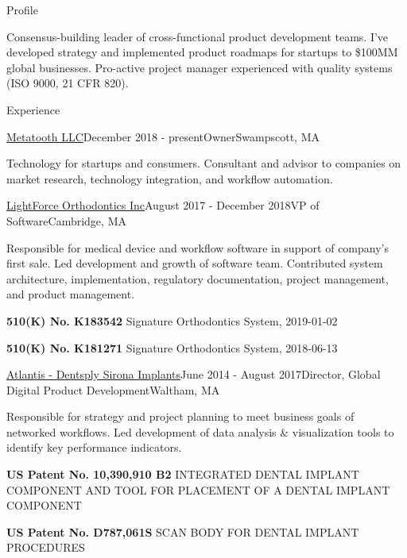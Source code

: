 \documentclass{resume}
\begin{document}
  
\begin{rSection}{Profile}
\item Consensus-building leader of cross-functional product development teams. I've developed strategy and implemented product roadmaps for startups to \$100MM global businesses. Pro-active project manager experienced with quality systems (ISO 9000, 21 CFR 820).
\end{rSection}

\begin{rSection}{Experience}

\begin{rSubsection}{\href{https://metatooth.com}{Metatooth LLC}}{December 2018 - present}{Owner}{Swampscott, MA}
\item Technology for startups and consumers. Consultant and advisor to companies on market research, technology integration, and workflow automation.
\end{rSubsection}

\begin{rSubsection}{\href{https://lightforceortho.com}{LightForce Orthodontics Inc}}{August 2017 - December 2018}{VP of Software}{Cambridge, MA}
\item Responsible for medical device and workflow software in support of company's first sale.  Led development and growth of software team. Contributed system architecture, implementation, regulatory documentation, project management, and product management.
\item \textbf{510(K) No. K183542} Signature Orthodontics System, 2019-01-02
\item \textbf{510(K) No. K181271} Signature Orthodontics System, 2018-06-13
\end{rSubsection}


\begin{rSubsection}{\href{https://dentsplysirona.com}{Atlantis - Dentsply Sirona Implants}}{June 2014 - August 2017}{Director, Global Digital Product Development}{Waltham, MA}
\item Responsible for strategy and project planning to meet business goals of networked workflows.  Led development of data analysis \& visualization tools to identify key performance indicators.
\item \textbf{US Patent No. 10,390,910 B2} INTEGRATED DENTAL IMPLANT COMPONENT AND TOOL FOR PLACEMENT OF A DENTAL IMPLANT COMPONENT
\item \textbf{US Patent No. D787,061S} SCAN BODY FOR DENTAL IMPLANT PROCEDURES
\end{rSubsection}


\end{rSection}
\end{document}
